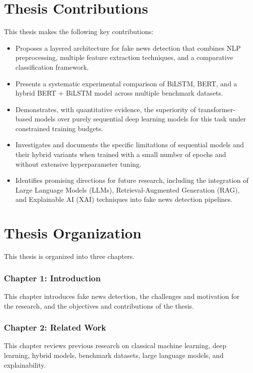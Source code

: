 \section{Thesis Contributions}

This thesis makes the following key contributions:

\begin{itemize}
\item Proposes a layered architecture for fake news detection that combines NLP preprocessing, multiple feature extraction techniques, and a comparative classification framework.
\item Presents a systematic experimental comparison of BiLSTM, BERT, and a hybrid BERT + BiLSTM model across multiple benchmark datasets.
\item Demonstrates, with quantitative evidence, the superiority of transformer-based models over purely sequential deep learning models for this task under constrained training budgets.
\item Investigates and documents the specific limitations of sequential models and their hybrid variants when trained with a small number of epochs and without extensive hyperparameter tuning.
\item Identifies promising directions for future research, including the integration of Large Language Models (LLMs), Retrieval-Augmented Generation (RAG), and Explainable AI (XAI) techniques into fake news detection pipelines.
\end{itemize}

\section{Thesis Organization}

This thesis is organized into three chapters.

\subsubsection*{Chapter 1: Introduction}
This chapter introduces fake news detection, the challenges and motivation for the research, and the objectives and contributions of the thesis.

\subsubsection*{Chapter 2: Related Work}
This chapter reviews previous research on classical machine learning, deep learning, hybrid models, benchmark datasets, large language models, and explainability.

